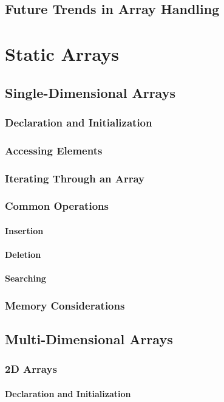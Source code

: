 \documentclass{book}
\begin{document}
\section{Future Trends in Array Handling}


\chapter{Static Arrays}
	\section{Single-Dimensional Arrays}
	\subsection{Declaration and Initialization}
	\subsection{Accessing Elements}
	\subsection{Iterating Through an Array}
	\subsection{Common Operations}
	\subsubsection{Insertion}
	\subsubsection{Deletion}
	\subsubsection{Searching}
	\subsection{Memory Considerations}
	
	\section{Multi-Dimensional Arrays}
	\subsection{2D Arrays}
	\subsubsection{Declaration and Initialization}
\end{document}
